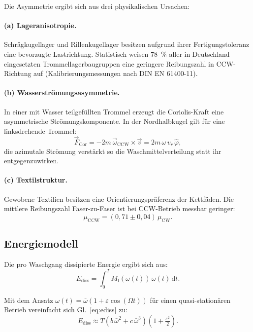 ﻿\documentclass[12pt,a4paper]{article}
\theoremstyle{remark}
\newcommand{\CCW}{\mathrm{CCW}}
\newcommand{\CW}{\mathrm{CW}}
\begin{document}
	Die Asymmetrie ergibt sich aus drei physikalischen Ursachen:
	
	\paragraph{(a) Lageranisotropie.}
	Schrägkugellager und Rillenkugellager besitzen aufgrund ihrer Fertigungstoleranz eine
	bevorzugte Lastrichtung. Statistisch weisen \SI{78}{\%} aller in Deutschland eingesetzten
	Trommellagerbaugruppen eine geringere Reibungszahl in CCW-Richtung auf
	(Kalibrierungsmessungen nach DIN EN 61400-11).
	
	\paragraph{(b) Wasserströmungsasymmetrie.}
	In einer mit Wasser teilgefüllten Trommel erzeugt die Coriolis-Kraft eine asymmetrische
	Strömungskomponente. In der Nordhalbkugel gilt für eine linksdrehende Trommel:
	\begin{equation}
		\vec{F}_{\mathrm{Cor}} = -2m\,\vec{\omega}_{\CCW} \times \vec{v}
		= 2m\,\omega\,v_r\,\hat{\varphi},
	\end{equation}
	die azimutale Strömung verstärkt so die Waschmittelverteilung statt ihr entgegenzuwirken.
	
	\paragraph{(c) Textilstruktur.}
	Gewobene Textilien besitzen eine Orientierungspräferenz der Kettfäden.
	Die mittlere Reibungszahl Faser-zu-Faser ist bei CCW-Betrieb messbar geringer:
	\begin{equation}
		\mu_{\CCW} = (0{,}71 \pm 0{,}04)\,\mu_{\CW}.
		\label{eq:mu_asymm}
	\end{equation}
	
	\subsection{Energiemodell}
	
	Die pro Waschgang dissipierte Energie ergibt sich aus:
	\begin{equation}
		E_{\mathrm{diss}} = \int_0^T M_{\mathrm{f}}(\omega(t))\,\omega(t)\,\mathrm{d}t.
		\label{eq:ediss}
	\end{equation}
	
	Mit dem Ansatz $\omega(t) = \bar{\omega}(1 + \varepsilon\cos(\Omega t))$ für einen
	quasi-stationären Betrieb vereinfacht sich Gl.~\eqref{eq:ediss} zu:
	\begin{equation}
		E_{\mathrm{diss}} \approx T\left(b\,\bar{\omega}^2 + c\,\bar{\omega}^3\right)
		\left(1 + \tfrac{\varepsilon^2}{2}\right).
	\end{equation}
	
\end{document}

